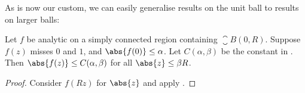 As is now our custom, we can easily generalise results on the unit ball to results on larger balls:

\begin{corollary}\label{cor9.12}
	Let $f$ be analytic on a simply connected region containing $\closure{B(0, R)}$.
	Suppose $f(z)$ misses $0$ and $1$, and $\abs{f(0)} \leq \alpha$.
	Let $C(\alpha, \beta)$ be the constant in .
	Then $\abs{f(z)} \leq C(\alpha, \beta)$ for all $\abs{z} \leq \beta R$.
\end{corollary}

\begin{proof}
	Consider $f(R z)$ for $\abs{z}$ and apply .
\end{proof}
